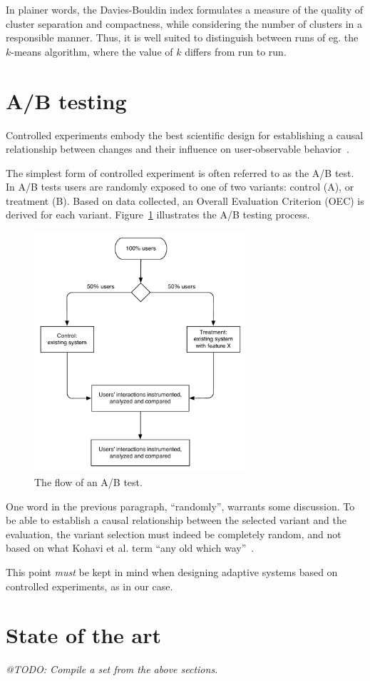 In plainer words, the Davies-Bouldin index formulates a measure of the quality of cluster separation and compactness, while considering the number of clusters in a responsible manner. Thus, it is well suited to distinguish between runs of eg. the $k$-means algorithm, where the value of $k$ differs from run to run.

\section{A/B testing}
\label{survey:sec:ab_testing}

Controlled experiments embody the best scientific design for establishing a causal relationship between changes and their influence on user-observable behavior~\cite{Kohavi2007,Kohavi2008}.

The simplest form of controlled experiment is often referred to as the A/B test. In A/B tests users are randomly exposed to one of two variants: control (A), or treatment (B). Based on data collected, an Overall Evaluation Criterion (OEC) is derived for each variant. Figure~\ref{fig:ab_flow} illustrates the A/B testing process.

\begin{figure}[h]
  \centering
    \includegraphics[width=0.7\textwidth]{Figures/ab-test-flow}
    \caption{The flow of an A/B test.}
    \label{fig:ab_flow}
\end{figure}

One word in the previous paragraph, ``randomly'', warrants some discussion. To be able to establish a causal relationship between the selected variant and the evaluation, the variant selection must indeed be completely random, and not based on what Kohavi et al. term ``any old which way''~\cite{Kohavi2007}.

This point \emph{must} be kept in mind when designing adaptive systems based on controlled experiments, as in our case.

\section{State of the art}
\label{survey:sub:state_of_the_art}

\emph{@TODO: Compile a set from the above sections.}
